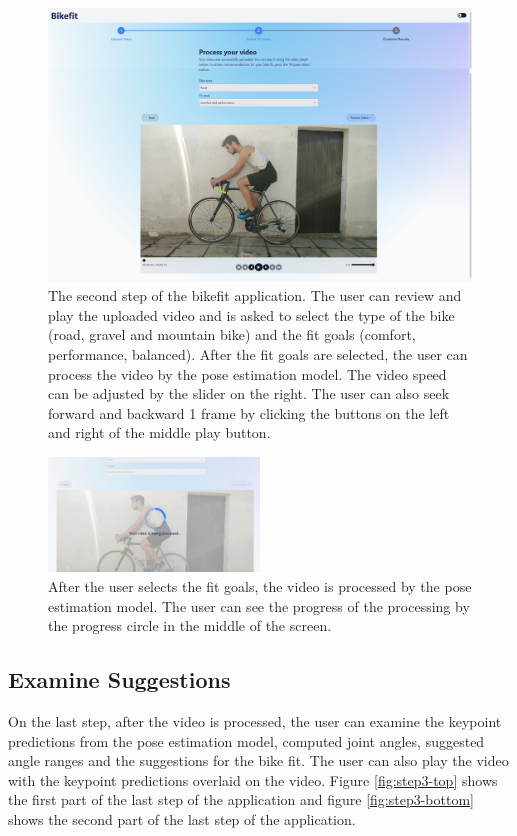 \begin{figure}[htbp]
    \centering
    \includegraphics[width=\textwidth]{obrazky-figures/step2.png}
    \caption{The second step of the bikefit application. The user can review and play the uploaded video and is asked to select the type of the bike (road, gravel and mountain bike) and the fit goals (comfort, performance, balanced). After the fit goals are selected, the user can process the video by the pose estimation model. The video speed can be adjusted by the slider on the right. The user can also seek forward and backward 1 frame by clicking the buttons on the left and right of the middle play button.}
    \label{fig:step2}
\end{figure}

\begin{figure}
    \centering
    \includegraphics[width=0.5\textwidth]{obrazky-figures/processing-crop.jpeg}
    \caption{After the user selects the fit goals, the video is processed by the pose estimation model. The user can see the progress of the processing by the progress circle in the middle of the screen.}
    \label{fig:processing}
\end{figure}


\subsection{Examine Suggestions} On the last step, after the video is processed, the user can examine the keypoint predictions from the pose estimation model, computed joint angles, suggested angle ranges and the suggestions for the bike fit. The user can also play the video with the keypoint predictions overlaid on the video. Figure \ref{fig:step3-top} shows the first part of the last step of the application and figure \ref{fig:step3-bottom} shows the second part of the last step of the application.




